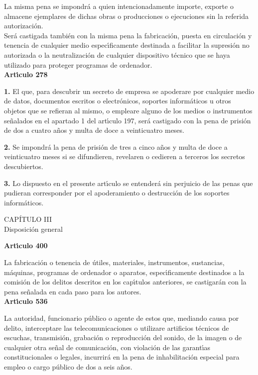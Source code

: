 La misma pena se impondr\'a a quien intencionadamente importe, exporte 
o almacene ejemplares de dichas obras o producciones o ejecuciones sin la 
referida autorizaci\'on.\\

Ser\'a castigada tambi\'en con la misma pena la fabricaci\'on, puesta en 
circulaci\'on y tenencia de cualquier medio espec\'{\i}ficamente destinada a 
facilitar la supresi\'on no autorizada o la neutralizaci\'on de cualquier 
dispositivo t\'ecnico que se haya utilizado para proteger programas de 
ordenador. 
\vspace{0.3cm}\\
{\large {\bf Art\'{\i}culo 278}} 
 
{\bf 1.} El que, para descubrir un secreto de empresa se apoderare por 
cualquier medio de datos, documentos escritos o electr\'onicos, soportes 
inform\'aticos u otros objetos que se refieran al mismo, o empleare alguno de 
los medios o instrumentos se\~nalados en el apartado 1 del art\'{\i}culo 197, 
ser\'a castigado con la pena de prisi\'on de dos a cuatro a\~nos y multa de 
doce a veinticuatro meses. 
 
{\bf 2.} Se impondr\'a la pena de prisi\'on de tres a cinco a\~nos y multa de 
doce a veinticuatro meses si se difundieren, revelaren o cedieren a terceros 
los secretos descubiertos. 
 
{\bf 3.} Lo dispuesto en el presente art\'{\i}culo se entender\'a sin perjuicio 
de las penas que pudieran corresponder por el apoderamiento o destrucci\'on de 
los soportes inform\'aticos. 
 
\begin{center}
{\Large CAP\'ITULO III}\\
Disposici\'on general 
\end{center}
{\large {\bf Art\'{\i}culo 400}}
 
La fabricaci\'on o tenencia de \'utiles, materiales, instrumentos, sustancias, 
m\'aquinas, programas de ordenador o aparatos, espec\'{\i}ficamente 
destinados a la comisi\'on de los delitos descritos en los cap\'{\i}tulos 
anteriores, se castigar\'an con la pena se\~nalada en cada paso para los 
autores. 
\vspace{0.3cm}\\
{\large {\bf Art\'{\i}culo 536}}
 
La autoridad, funcionario p\'ublico o agente de estos que, mediando 
causa por delito, interceptare las telecomunicaciones o utilizare artificios 
t\'ecnicos de escuchas, transmisi\'on, grabaci\'on o reproducci\'on del sonido, 
de la imagen o de cualquier otra se\~nal de comunicaci\'on, con violaci\'on de 
las garant\'{\i}as constitucionales o legales, incurrir\'a en la pena de 
inhabilitaci\'on especial para empleo o cargo p\'ublico de dos a seis a\~nos.\\
 
